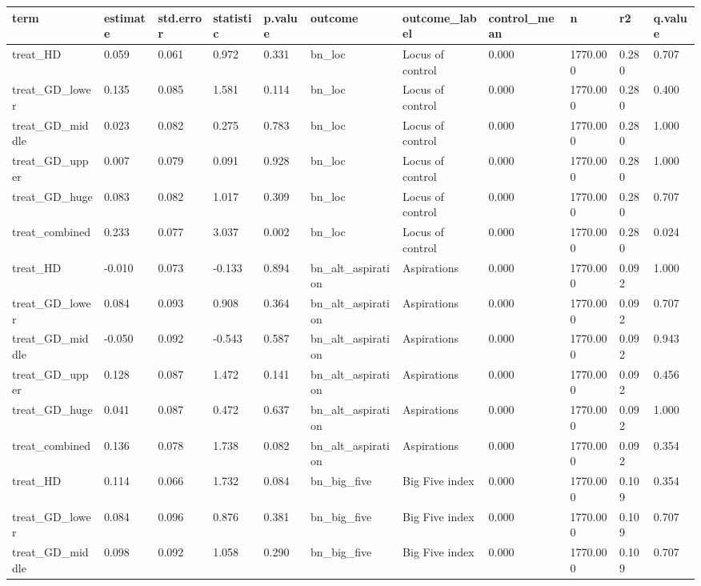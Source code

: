 \begin{tabular}{lllllllllll}
\toprule
term & estimate & std.error & statistic & p.value & outcome & outcome\_label & control\_mean & n & r2 & q.value
 \\
\midrule
treat\_HD & 0.059 & 0.061 & 0.972 & 0.331 & bn\_loc & Locus of control & 0.000 & 1770.000 & 0.280 & 0.707 \\
treat\_GD\_lower & 0.135 & 0.085 & 1.581 & 0.114 & bn\_loc & Locus of control & 0.000 & 1770.000 & 0.280 & 0.400 \\
treat\_GD\_middle & 0.023 & 0.082 & 0.275 & 0.783 & bn\_loc & Locus of control & 0.000 & 1770.000 & 0.280 & 1.000 \\
treat\_GD\_upper & 0.007 & 0.079 & 0.091 & 0.928 & bn\_loc & Locus of control & 0.000 & 1770.000 & 0.280 & 1.000 \\
treat\_GD\_huge & 0.083 & 0.082 & 1.017 & 0.309 & bn\_loc & Locus of control & 0.000 & 1770.000 & 0.280 & 0.707 \\
treat\_combined & 0.233 & 0.077 & 3.037 & 0.002 & bn\_loc & Locus of control & 0.000 & 1770.000 & 0.280 & 0.024 \\
treat\_HD & -0.010 & 0.073 & -0.133 & 0.894 & bn\_alt\_aspiration & Aspirations & 0.000 & 1770.000 & 0.092 & 1.000 \\
treat\_GD\_lower & 0.084 & 0.093 & 0.908 & 0.364 & bn\_alt\_aspiration & Aspirations & 0.000 & 1770.000 & 0.092 & 0.707 \\
treat\_GD\_middle & -0.050 & 0.092 & -0.543 & 0.587 & bn\_alt\_aspiration & Aspirations & 0.000 & 1770.000 & 0.092 & 0.943 \\
treat\_GD\_upper & 0.128 & 0.087 & 1.472 & 0.141 & bn\_alt\_aspiration & Aspirations & 0.000 & 1770.000 & 0.092 & 0.456 \\
treat\_GD\_huge & 0.041 & 0.087 & 0.472 & 0.637 & bn\_alt\_aspiration & Aspirations & 0.000 & 1770.000 & 0.092 & 1.000 \\
treat\_combined & 0.136 & 0.078 & 1.738 & 0.082 & bn\_alt\_aspiration & Aspirations & 0.000 & 1770.000 & 0.092 & 0.354 \\
treat\_HD & 0.114 & 0.066 & 1.732 & 0.084 & bn\_big\_five & Big Five index & 0.000 & 1770.000 & 0.109 & 0.354 \\
treat\_GD\_lower & 0.084 & 0.096 & 0.876 & 0.381 & bn\_big\_five & Big Five index & 0.000 & 1770.000 & 0.109 & 0.707 \\
treat\_GD\_middle & 0.098 & 0.092 & 1.058 & 0.290 & bn\_big\_five & Big Five index & 0.000 & 1770.000 & 0.109 & 0.707 \\

\end{tabular}
